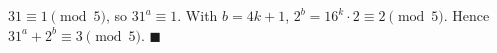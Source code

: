 $31\equiv1\pmod5$, so $31^a\equiv1$. With $b=4k+1$, $2^b=16^k\cdot2\equiv2\pmod5$. Hence $31^a+2^b\equiv3\pmod5$. $\blacksquare$
